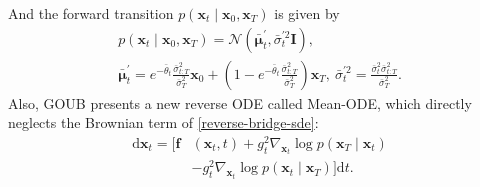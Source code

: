 And the forward transition $p(\mathbf{x}_t\mid\mathbf{x}_0,\mathbf{x}_T)$ is given by
\begin{equation}\label{gou_transition}
\begin{gathered}
p(\mathbf{x}_t\mid\mathbf{x}_0,\mathbf{x}_T)=\mathcal{N}(\bar{\boldsymbol{\mu}}_{t}^{\prime},\bar{\sigma}_t^{\prime2}\mathbf{I}), \\
\bar{\boldsymbol{\mu}}_{t}^{\prime}=e^{-\bar{\theta}_t}\frac{\bar{\sigma}_{t:T}^2}{\bar{\sigma}_T^2}\mathbf{x}_0 + ( 1 - e^{-\bar{\theta}_t}\frac{\bar{\sigma}_{t:T}^2}{\bar{\sigma}_T^2} )\mathbf{x}_T, \ \bar{\sigma}_t^{\prime2}=\frac{\bar{\sigma}_t^2\bar{\sigma}_{t:T}^2}{\bar{\sigma}_T^2}.
\end{gathered}
\end{equation}
Also, GOUB presents a new reverse ODE called Mean-ODE, which directly neglects the Brownian term of \eqref{reverse-bridge-sde}: 
\begin{equation}\label{reverse-mean-ode}
\begin{aligned}
\mathrm{d} \mathbf{x}_t = \Big[ \mathbf{f}&(\mathbf{x}_t, t) + g^2_t \nabla_{\mathbf{x}_t} \log p(\mathbf{x}_T \mid \mathbf{x}_t) \\
& - g_t^2\nabla_{\mathbf{x}_t} \log p(\mathbf{x}_t \mid \mathbf{x}_T) \Big] \mathrm{d} t.
\end{aligned}
\end{equation}

\vspace{-5mm}
